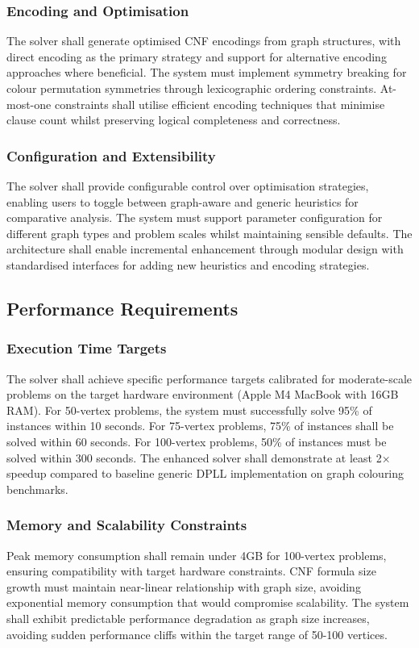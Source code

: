 \subsubsection{Encoding and Optimisation}
The solver shall generate optimised CNF encodings from graph structures, with direct encoding as the primary strategy and support for alternative encoding approaches where beneficial. The system must implement symmetry breaking for colour permutation symmetries through lexicographic ordering constraints. At-most-one constraints shall utilise efficient encoding techniques that minimise clause count whilst preserving logical completeness and correctness.

\subsubsection{Configuration and Extensibility}
The solver shall provide configurable control over optimisation strategies, enabling users to toggle between graph-aware and generic heuristics for comparative analysis. The system must support parameter configuration for different graph types and problem scales whilst maintaining sensible defaults. The architecture shall enable incremental enhancement through modular design with standardised interfaces for adding new heuristics and encoding strategies.

\subsection{Performance Requirements}

\subsubsection{Execution Time Targets}
The solver shall achieve specific performance targets calibrated for moderate-scale problems on the target hardware environment (Apple M4 MacBook with 16GB RAM). For 50-vertex problems, the system must successfully solve 95\% of instances within 10 seconds. For 75-vertex problems, 75\% of instances shall be solved within 60 seconds. For 100-vertex problems, 50\% of instances must be solved within 300 seconds. The enhanced solver shall demonstrate at least 2× speedup compared to baseline generic DPLL implementation on graph colouring benchmarks.

\subsubsection{Memory and Scalability Constraints}
Peak memory consumption shall remain under 4GB for 100-vertex problems, ensuring compatibility with target hardware constraints. CNF formula size growth must maintain near-linear relationship with graph size, avoiding exponential memory consumption that would compromise scalability. The system shall exhibit predictable performance degradation as graph size increases, avoiding sudden performance cliffs within the target range of 50-100 vertices.

